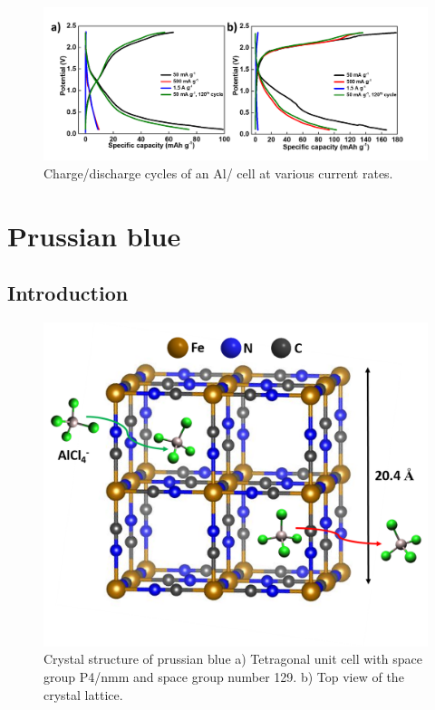 \begin{figure}[th!]
\centering
\includegraphics[width=\textwidth]{Figures/chap6fig/C3N4cdc}
\caption{Charge/discharge cycles of an Al/ cell at various current rates.}
\label{Figures/chap6fig:C3N4cdc}
\end{figure}

\section{Prussian blue}

\subsection{Introduction}

 \begin{figure}[tbh!]
  \centering
  \includegraphics[width=\textwidth]{Figures/chap6fig/pbcrys}
    \caption{Crystal structure of prussian blue a) Tetragonal unit cell with space group P4/nmm and space group number 129. b) Top view of the crystal lattice.}
  \label{Figures/chap6fig:pbcrys}
\end{figure}

